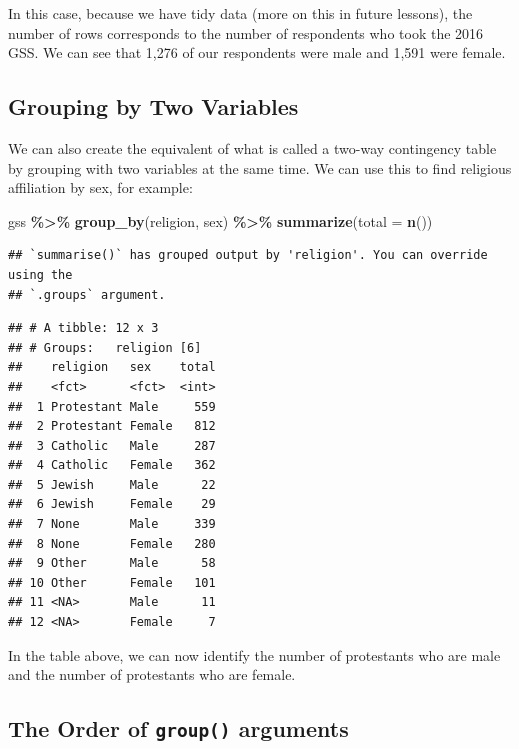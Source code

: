 \documentclass[
]{book}
\newenvironment{Shaded}{\begin{snugshade}}{\end{snugshade}}
\newcommand{\AttributeTok}[1]{\textcolor[rgb]{0.13,0.29,0.53}{#1}}
\newcommand{\FunctionTok}[1]{\textcolor[rgb]{0.13,0.29,0.53}{\textbf{#1}}}
\newcommand{\NormalTok}[1]{#1}
\newcommand{\SpecialCharTok}[1]{\textcolor[rgb]{0.81,0.36,0.00}{\textbf{#1}}}
\begin{document}
In this case, because we have tidy data (more on this in future lessons), the number of rows corresponds to the number of respondents who took the 2016 GSS. We can see that 1,276 of our respondents were male and 1,591 were female.

\hypertarget{grouping-by-two-variables}{%
\subsection{Grouping by Two Variables}\label{grouping-by-two-variables}}

We can also create the equivalent of what is called a two-way contingency table by grouping with two variables at the same time. We can use this to find religious affiliation by sex, for example:

\begin{Shaded}
\begin{Highlighting}[]
\NormalTok{gss }\SpecialCharTok{\%\textgreater{}\%}
  \FunctionTok{group\_by}\NormalTok{(religion, sex) }\SpecialCharTok{\%\textgreater{}\%}
  \FunctionTok{summarize}\NormalTok{(}\AttributeTok{total =} \FunctionTok{n}\NormalTok{())}
\end{Highlighting}
\end{Shaded}

\begin{verbatim}
## `summarise()` has grouped output by 'religion'. You can override using the
## `.groups` argument.
\end{verbatim}

\begin{verbatim}
## # A tibble: 12 x 3
## # Groups:   religion [6]
##    religion   sex    total
##    <fct>      <fct>  <int>
##  1 Protestant Male     559
##  2 Protestant Female   812
##  3 Catholic   Male     287
##  4 Catholic   Female   362
##  5 Jewish     Male      22
##  6 Jewish     Female    29
##  7 None       Male     339
##  8 None       Female   280
##  9 Other      Male      58
## 10 Other      Female   101
## 11 <NA>       Male      11
## 12 <NA>       Female     7
\end{verbatim}

In the table above, we can now identify the number of protestants who are male and the number of protestants who are female.

\hypertarget{the-order-of-group-arguments}{%
\subsection{\texorpdfstring{The Order of \texttt{group()} arguments}{The Order of group() arguments}}\label{the-order-of-group-arguments}}
\end{document}
